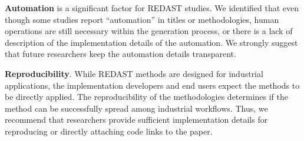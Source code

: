 \textbf{Automation} is a significant factor for REDAST studies. We identified that even though some studies report ``automation'' in titles or methodologies, human operations are still necessary within the generation process, or there is a lack of description of the implementation details of the automation. We strongly suggest that future researchers keep the automation details transparent.

\textbf{Reproducibility}. While REDAST methods are designed for industrial applications, the implementation developers and end users expect the methods to be directly applied. The reproducibility of the methodologies determines if the method can be successfully spread among industrial workflows. Thus, we recommend that researchers provide sufficient implementation details for reproducing or directly attaching code links to the paper.